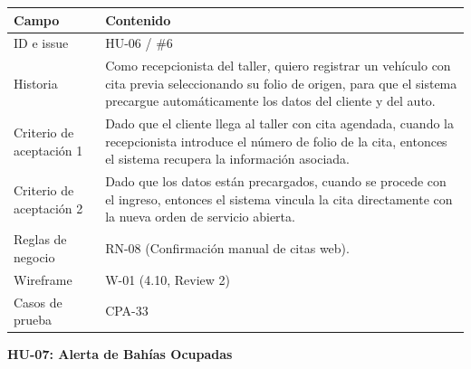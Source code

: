 {\def\LTcaptype{none} %
\begin{longtable}[]{@{}
  >{\raggedright\arraybackslash}p{}
  >{\raggedright\arraybackslash}p{}@{}}
\toprule\noalign{}
\begin{minipage}[b]{\linewidth}\raggedright
\textbf{Campo}
\end{minipage} & \begin{minipage}[b]{\linewidth}\raggedright
\textbf{Contenido}
\end{minipage} \\
\midrule\noalign{}
\endhead
\bottomrule\noalign{}
\endlastfoot
ID e issue & HU-06 / \#6 \\
Historia & Como recepcionista del taller, quiero registrar un vehículo
con cita previa seleccionando su folio de origen, para que el sistema
precargue automáticamente los datos del cliente y del auto. \\
Criterio de aceptación 1 & Dado que el cliente llega al taller con cita
agendada, cuando la recepcionista introduce el número de folio de la
cita, entonces el sistema recupera la información asociada. \\
Criterio de aceptación 2 & Dado que los datos están precargados, cuando
se procede con el ingreso, entonces el sistema vincula la cita
directamente con la nueva orden de servicio abierta. \\
Reglas de negocio & RN-08 (Confirmación manual de citas web). \\
Wireframe & W-01 (4.10, Review 2) \\
Casos de prueba & CPA-33 \\
\end{longtable}
}

\textbf{HU-07: Alerta de Bahías Ocupadas}

